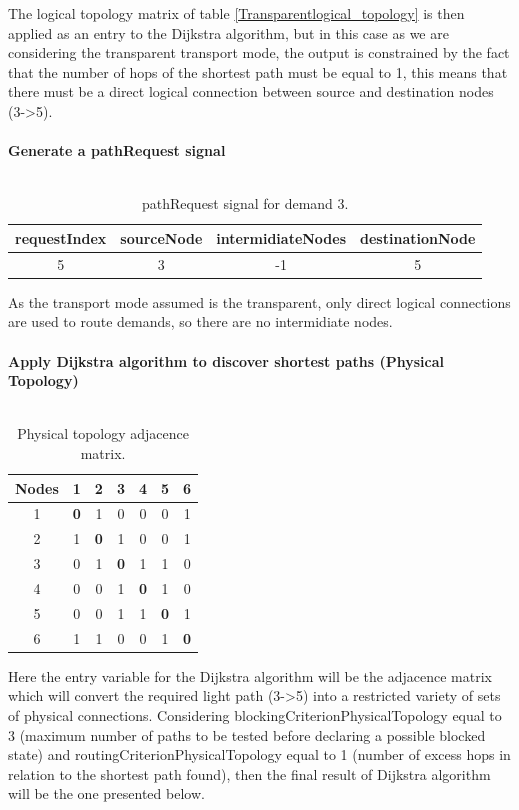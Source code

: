 The logical topology matrix of table \ref{Transparentlogical_topology} is then applied as an entry to the Dijkstra algorithm, but in this case as we are considering the transparent transport mode, the output is constrained by the fact that the number of hops of the shortest path must be equal to 1, this means that there must be a direct logical connection between source and destination nodes (3->5).\\ \\

\textbf{Generate a pathRequest signal}\\ \\

\begin{table}[H]
	\centering
	\begin{tabular}{|c|c|c|c|}
		\hline
		requestIndex & sourceNode & intermidiateNodes & destinationNode \\ \hline
		5            & 3          & -1                 & 5               \\ \hline
	\end{tabular}
	\caption{pathRequest signal for demand 3.}
\end{table} 

As the transport mode assumed is the transparent, only direct logical connections are used to route demands, so there are no intermidiate nodes.\\ \\

\textbf{Apply Dijkstra algorithm to discover shortest paths (Physical Topology)}\\ \\
\begin{table}[H]
	\centering
	\begin{tabular}{|c|c|c|c|c|c|c|}
		\hline
		\textbf{Nodes} & 1 & 2 & 3 & 4 & 5 & 6 \\ \hline
		1     & \textbf{0} & 1 & 0 & 0 & 0 & 1 \\ \hline
		2     & 1 & \textbf{0} & 1 & 0 & 0 & 1 \\ \hline
		3     & 0 & 1 & \textbf{0} & 1 & 1 & 0 \\ \hline
		4     & 0 & 0 & 1 & \textbf{0} & 1 & 0 \\ \hline
		5     & 0 & 0 & 1 & 1 & \textbf{0} & 1 \\ \hline
		6     & 1 & 1 & 0 & 0 & 1 & \textbf{0} \\ \hline
	\end{tabular}
	\caption{Physical topology adjacence matrix.}
	\label{Adjacence_Matrix}
\end{table}
Here the entry variable for the Dijkstra algorithm will be the adjacence matrix which will convert the required light path (3->5) into a restricted variety of sets of physical connections. Considering blockingCriterionPhysicalTopology equal to 3 (maximum number of paths to be tested before declaring a possible blocked state) and routingCriterionPhysicalTopology equal to 1 (number of excess hops in relation to the shortest path found), then the final result of Dijkstra algorithm will be the one presented below.

